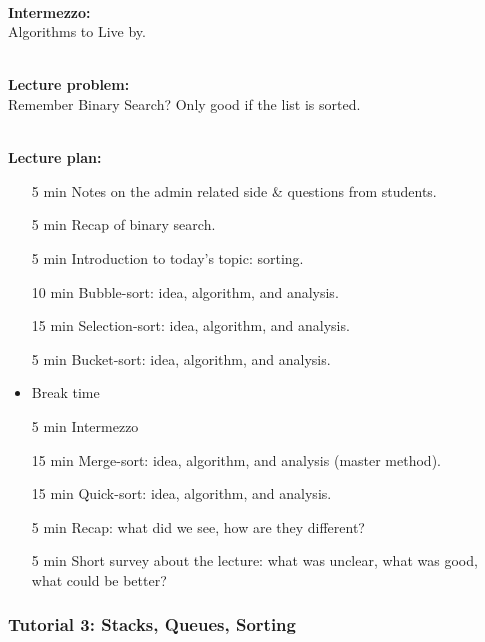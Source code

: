 \hfill\\
\textbf{Intermezzo:}\\
Algorithms to Live by.

\hfill\\
\textbf{Lecture problem:}\\
Remember Binary Search? Only good if the list is sorted. 

\hfill\\
\textbf{Lecture plan:}\\
\begin{itemize}
	\item[5 min] Notes on the admin related side \& questions from students.
	\item[5 min] Recap of binary search.
	\item[5 min] Introduction to today's topic: sorting.
	\item[10 min] Bubble-sort: idea, algorithm, and analysis.
	\item[15 min] Selection-sort: idea, algorithm, and analysis.
	\item[5 min] Bucket-sort: idea, algorithm, and analysis.
	\item Break time
	\item[5 min] Intermezzo
	\item[15 min] Merge-sort: idea, algorithm, and analysis (master method).
	\item[15 min] Quick-sort: idea, algorithm, and analysis.
	\item[5 min] Recap: what did we see, how are they different?
	\item[5 min] Short survey about the lecture: what was unclear, what was good, what could be better?
\end{itemize}

\newpage
\subsubsection{Tutorial 3: Stacks, Queues, Sorting}
\label{ssub:tutorial_3}

